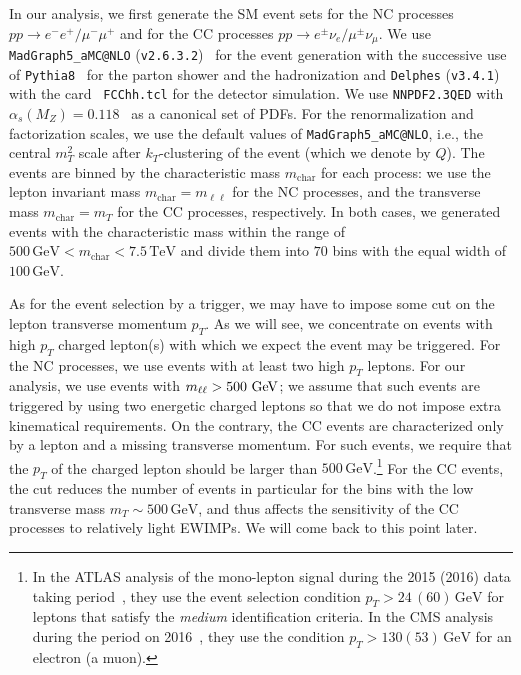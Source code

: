 \documentclass[12pt,twoside,book]{article}
\begin{document}
In our analysis, we first generate the SM event sets for the NC
processes $pp\to e^{-}e^{+} / \mu^{-}\mu^{+}$ and for the CC processes
$pp\to e^{\pm}\nu_e / \mu^{\pm}\nu_\mu$.  We use
\texttt{MadGraph5\_aMC@NLO} (\texttt{v2.6.3.2})~\cite{Alwall:2011uj,
Alwall:2014hca} for the event generation with the successive use of
\texttt{Pythia8}~\cite{Sjostrand:2014zea} for the parton shower and
the hadronization and \texttt{Delphes}
(\texttt{v3.4.1})~\cite{deFavereau:2013fsa} with the card {\tt
FCChh.tcl} for the detector simulation.  We use \texttt{NNPDF2.3QED}
with $\alpha_s (M_Z) = 0.118$~\cite{Ball:2013hta} as a canonical set
of PDFs.  For the renormalization and factorization scales, we use the
default values of \texttt{MadGraph5\_aMC@NLO}, i.e., the central
$m_T^2$ scale after $k_T$-clustering of the event (which we denote by
$Q$).  The events are binned by the characteristic mass
$m_{\mathrm{char}}$ for each process: we use the lepton invariant mass
$m_{\mathrm{char}} = m_{\ell\ell}$ for the NC processes, and the
transverse mass $m_{\mathrm{char}} = m_T$ for the CC processes,
respectively.  In both cases, we generated events with the
characteristic mass within the range of $500\,\mathrm{GeV} <
m_\mathrm{char} < 7.5\,\mathrm{TeV}$ and divide them into $70$ bins
with the equal width of $100\,\mathrm{GeV}$.

As for the event selection by a trigger, we may have to impose some cut
on the lepton transverse momentum $p_T$.  As we will see, we concentrate
on events with high $p_T$ charged lepton(s) with which we expect the
event may be triggered.  For the NC processes, we use events with at
least two high $p_T$ leptons.  For our analysis, we use events with
$m_{\ell\ell}>500\ {\rm GeV}$; we assume that such events are triggered
by using two energetic charged leptons so that we do not impose extra
kinematical requirements.  On the contrary, the CC events are
characterized only by a lepton and a missing transverse momentum.  For
such events, we require that the $p_T$ of the charged lepton should be
larger than $500\,\mathrm{GeV}$.\footnote{
In the ATLAS analysis of the mono-lepton signal during the 2015 (2016)
data taking period~\cite{Aaboud:2017efa}, they use the event selection
condition $p_T > 24\, (60)\,\mathrm{GeV}$ for leptons that satisfy the
\textit{medium} identification criteria.  In the CMS analysis during
the period on 2016~\cite{Sirunyan:2018mpc}, they use the condition
$p_T > 130 (53)\, \mathrm{GeV}$ for an electron (a muon).
} For the CC events, the cut reduces the number of events in particular
for the bins with the low transverse mass $m_T \sim 500\, \mathrm{GeV}$,
and thus affects the sensitivity of the CC processes to relatively light
EWIMPs.  We will come back to this point later.
\end{document}
